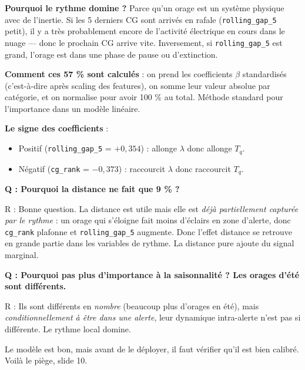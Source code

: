 \documentclass[11pt,a4paper]{article}
\begin{document}
\begin{compr}
\textbf{Pourquoi le rythme domine ?} Parce qu'un orage est un système physique avec de
l'inertie. Si les 5 derniers CG sont arrivés en rafale (\texttt{rolling\_gap\_5} petit),
il y a très probablement encore de l'activité électrique en cours dans le nuage —
donc le prochain CG arrive vite. Inversement, si \texttt{rolling\_gap\_5} est grand,
l'orage est dans une phase de pause ou d'extinction.

\textbf{Comment ces 57 \% sont calculés} : on prend les coefficients $\beta$ standardisés
(c'est-à-dire après scaling des features), on somme leur valeur absolue par catégorie,
et on normalise pour avoir 100 \% au total. Méthode standard pour l'importance dans un
modèle linéaire.

\textbf{Le signe des coefficients} :
\begin{itemize}[topsep=2pt]
    \item Positif (\texttt{rolling\_gap\_5} = $+0{,}354$) : allonge $\lambda$ donc allonge $T_q$.
    \item Négatif (\texttt{cg\_rank} = $-0{,}373$) : raccourcit $\lambda$ donc raccourcit $T_q$.
\end{itemize}
\end{compr}

\begin{piege}
\textbf{Q : Pourquoi la distance ne fait que 9 \% ?}

R : Bonne question. La distance est utile mais elle est \emph{déjà partiellement
capturée par le rythme} : un orage qui s'éloigne fait moins d'éclairs en zone d'alerte,
donc \texttt{cg\_rank} plafonne et \texttt{rolling\_gap\_5} augmente. Donc l'effet
\og distance \fg{} se retrouve en grande partie dans les variables de rythme. La distance
pure ajoute du signal marginal.

\textbf{Q : Pourquoi pas plus d'importance à la saisonnalité ? Les orages d'été sont
différents.}

R : Ils sont différents en \emph{nombre} (beaucoup plus d'orages en été), mais
\emph{conditionnellement à être dans une alerte}, leur dynamique intra-alerte n'est pas
si différente. Le rythme local domine.
\end{piege}

\begin{transit}
\og Le modèle est bon, mais avant de le déployer, il faut vérifier qu'il est bien calibré.
Voilà le piège, slide 10. \fg{}
\end{transit}
\end{document}
